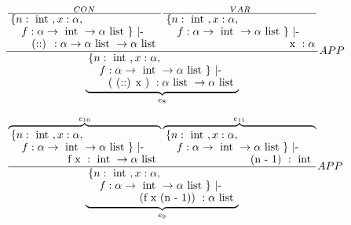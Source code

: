 \begin{equation}
	\frac
	{
	      	\frac
		{
			CON
		}
		{
        			\splitfrac
			{
        				\splitfrac
				{
					\{ n: \tauthree, x: \tautwo,
                 		}
                			{
 					f: \tauone \} \text{ |- }                         		
 				}
               		}
                		{
                	                \text{ (::) }: \tautwo \rightarrow \taufour \rightarrow \taufour
	                 }
               }
	      	\frac
		{
			VAR
		}
		{
        			\splitfrac
			{
        				\splitfrac
				{
					\{ n: \tauthree, x: \tautwo,
                 		}
                			{
 					f: \tauone \} \text{ |- }                         		
 				}
               		}
                		{
                	                \text{ x }: \tautwo
	                 }
               }
	} 
        {
        	      \underbrace{
        			\splitfrac
			{
        				\splitfrac
				{
					\{ n: \tauthree, x: \tautwo,
                         		}
                	        		{
 					f: \tauone \} \text{ |- }                         		
 				}
                         }
                	        {
                                 \text{ ( (::) x ) }: \taufour \rightarrow \taufour
                         }
               }_{e_8}
	}
        {
            APP
        }
\end{equation}

\begin{equation}
	\frac
	{
	        	      \overbrace{
	        			\splitfrac
				{
        					\splitfrac
					{
						\{ n: \tauthree, x: \tautwo,
	                         		}
        		        	        		{
 						f: \tauone \} \text{ |- }                         		
 					}
 	                        }
        		               {
                         		        \text{ f x }: \tauthree \rightarrow \taufour
                         	      }
                     }^{e_{10}}
	        	      \overbrace{
	        			\splitfrac
				{
        					\splitfrac
					{
						\{ n: \tauthree, x: \tautwo,
	                         		}
        		        	        		{
 						f: \tauone \} \text{ |- }                         		
 					}
 	                        }
        		               {
                         		        \text{ (n - 1) }: \tauthree
                         	      }
                     }^{e_{11}}
	} 
        {
        	      \underbrace{
        			\splitfrac
			{
        				\splitfrac
				{
					\{ n: \tauthree, x: \tautwo,
                         		}
                	        		{
 					f: \tauone \} \text{ |- }                         		
 				}
                         }
                	        {
                                 \text{ (f x (n - 1)) }: \taufour
                         }
               }_{e_9}
	}
        {
            APP
        }
\end{equation}

